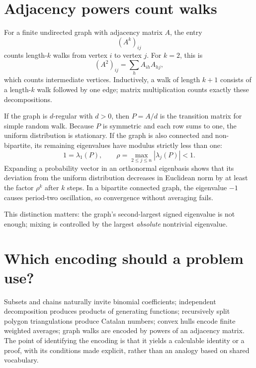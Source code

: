 \section{Adjacency powers count walks}

For a finite undirected graph with adjacency matrix \(A\), the entry
\[
 (A^k)_{ij}
\]
counts length-\(k\) walks from vertex \(i\) to vertex \(j\). For \(k=2\), this is
\[
 (A^2)_{ij}=\sum_hA_{ih}A_{hj},
\]
which counts intermediate vertices. Inductively, a walk of length \(k+1\) consists of a length-\(k\) walk followed by one edge; matrix multiplication counts exactly these decompositions.

If the graph is \(d\)-regular with \(d>0\), then \(P=A/d\) is the transition matrix for simple random walk. Because \(P\) is symmetric and each row sums to one, the uniform distribution is stationary. If the graph is also connected and non-bipartite, its remaining eigenvalues have modulus strictly less than one:
\[
 1=\lambda_1(P),\qquad
 \rho=\max_{2\le j\le n}|\lambda_j(P)|<1.
\]
Expanding a probability vector in an orthonormal eigenbasis shows that its deviation from the uniform distribution decreases in Euclidean norm by at least the factor \(\rho^k\) after \(k\) steps. In a bipartite connected graph, the eigenvalue \(-1\) causes period-two oscillation, so convergence without averaging fails.

This distinction matters: the graph's second-largest signed eigenvalue is not enough; mixing is controlled by the largest \emph{absolute} nontrivial eigenvalue.

\section{Which encoding should a problem use?}

Subsets and chains naturally invite binomial coefficients; independent decomposition produces products of generating functions; recursively split polygon triangulations produce Catalan numbers; convex hulls encode finite weighted averages; graph walks are encoded by powers of an adjacency matrix. The point of identifying the encoding is that it yields a calculable identity or a proof, with its conditions made explicit, rather than an analogy based on shared vocabulary.

